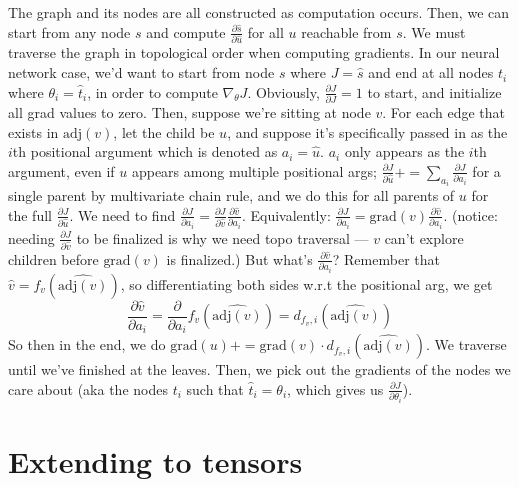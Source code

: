 \documentclass[12pt]{article}
\begin{document}
\begin{outline}
The graph and its nodes are all constructed as computation occurs. Then, we can start from any node $s$ and compute $\displaystyle \frac{\partial \hat s}{\partial \hat u}$ for all $u$ reachable from $s$. We must traverse the graph in topological order when computing gradients.
\1 In our neural network case, we'd want to start from node $s$ where $J=\hat s$ and end at all nodes $t_i$ where $\theta_i = \hat t_i$, in order to compute $\nabla_\theta J$. Obviously, $\displaystyle \frac{\partial J}{\partial J} = 1$ to start, and initialize all grad values to zero.
\1 Then, suppose we're sitting at node $v$. For each edge that exists in $\text{adj}(v)$, let the child be $u$, and suppose it's specifically passed in as the $i$th positional argument which is denoted as $a_i = \hat{u}$. $a_i$ only appears as the $i$th argument, even if $u$ appears among multiple positional args; $\displaystyle \frac{\partial J}{\partial \hat{u}} += \sum_{a_i} \frac{\partial J}{\partial a_i}$ for a single parent by multivariate chain rule, and we do this for all parents of $u$ for the full $\displaystyle \frac{\partial J}{\partial \hat u}$.
\2 We need to find $\displaystyle \frac{\partial J}{\partial a_i} = \frac{\partial J}{\partial \hat v} \frac{\partial \hat v}{\partial a_i}$. Equivalently: $\displaystyle \frac{\partial J}{\partial a_i} = \text{grad}(v) \frac{\partial \hat v}{\partial a_i}$. (notice: needing $\displaystyle \frac{\partial J}{\partial \hat v}$ to be finalized is why we need topo traversal --- $v$ can't explore children before $\text{grad}(v)$ is finalized.) But what's $\displaystyle \frac{\partial \hat v}{\partial a_i}$?
\2 Remember that $\hat v = f_v(\hat{\text{adj}(v)})$, so differentiating both sides w.r.t the positional arg, we get
\[ \frac{\partial \hat v}{\partial a_i} = \frac{\partial}{\partial a_i} f_v(\hat{\text{adj}(v)}) = d_{f_v, i}(\hat{\text{adj}(v)})\]
\2 So then in the end, we do $\displaystyle \boxed{\text{grad}(u) += \text{grad}(v) \cdot d_{f_v, i}(\hat{\text{adj}(v)})}$.
\1 We traverse until we've finished at the leaves. Then, we pick out the gradients of the nodes we care about (aka the nodes $t_i$ such that $\hat t_i = \theta_i$, which gives us $\displaystyle \frac{\partial J}{\partial \theta_i}$).
\0

\section{Extending to tensors}


\end{outline}
\end{document}
